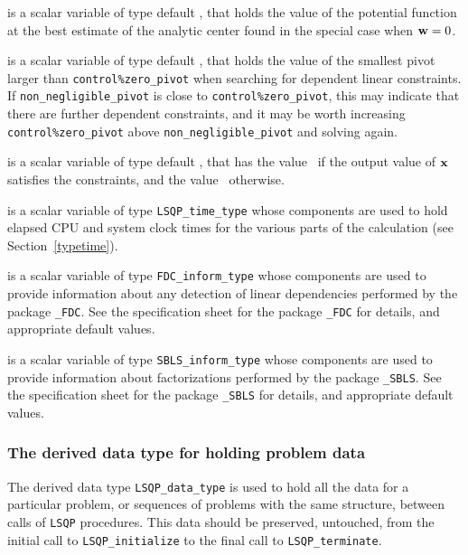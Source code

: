 \documentclass{galahad}
\newcommand{\packagename}{LSQP}
\begin{document}
\begin{description}
 is a scalar variable of type default \realdp, that holds the
value of the potential function at the best estimate of the analytic center 
found in the special case when ${\mathbf{w}} = 0$.

 is a scalar variable of type default \realdp, 
that holds the value of the smallest pivot larger than {\tt control\%zero\_pivot}
when searching for dependent linear constraints. If 
{\tt non\_negligible\_pivot} is close to  {\tt control\%zero\_pivot},
this may indicate that there are further dependent constraints, and
it may be worth increasing {\tt control\%zero\_pivot} above 
{\tt non\_negligible\_pivot} and solving again.

 is a scalar variable of type default \logical, that has the
value \true\ if the output value of ${\mathbf{x}}$ satisfies the constraints,
and the value \false\ otherwise.

 is a scalar variable of type {\tt \packagename\_time\_type} 
whose components are used to hold elapsed CPU  and system clock 
times for the various parts of the calculation
(see Section~\ref{typetime}).

 is a scalar variable of type 
{\tt FDC\_inform\_type}
whose components are used to provide information about 
any detection of linear dependencies
performed by the package 
{\tt \libraryname\_FDC}. 
See the specification sheet for the package 
{\tt \libraryname\_FDC} 
for details, and appropriate default values.

 is a scalar variable of type 
{\tt SBLS\_inform\_type}
whose components are used to provide information about factorizations
performed by the package 
{\tt \libraryname\_SBLS}. 
See the specification sheet for the package 
{\tt \libraryname\_SBLS} 
for details, and appropriate default values.

\end{description}


\subsubsection{The derived data type for holding problem data}\label{typedata}
The derived data type 
{\tt \packagename\_data\_type} 
is used to hold all the data for a particular problem,
or sequences of problems with the same structure, between calls of 
{\tt \packagename} procedures. 
This data should be preserved, untouched, from the initial call to 
{\tt \packagename\_initialize}
to the final call to
{\tt \packagename\_terminate}.
\end{document}
